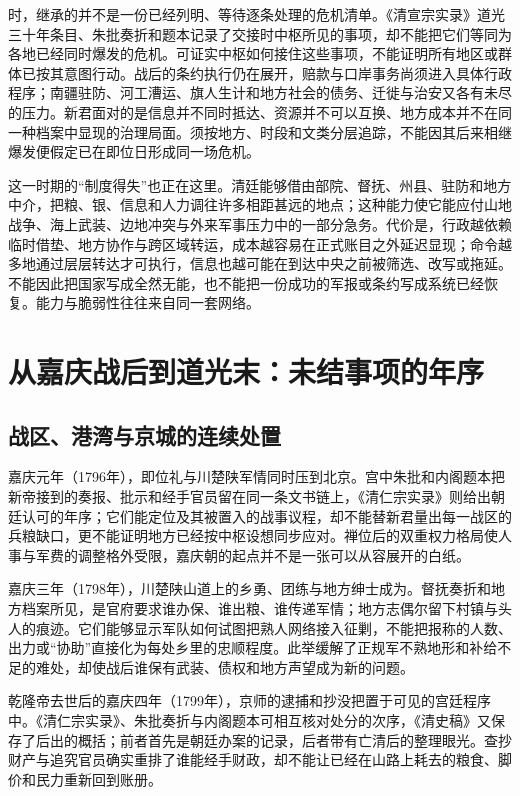 时，继承的并不是一份已经列明、等待逐条处理的危机清单。《清宣宗实录》道光三十年条目、朱批奏折和题本记录了交接时中枢所见的事项，却不能把它们等同为各地已经同时爆发的危机。可证实中枢如何接住这些事项，不能证明所有地区或群体已按其意图行动。战后的条约执行仍在展开，赔款与口岸事务尚须进入具体行政程序；南疆驻防、河工漕运、旗人生计和地方社会的债务、迁徙与治安又各有未尽的压力。新君面对的是信息并不同时抵达、资源并不可以互换、地方成本并不在同一种档案中显现的治理局面。须按地方、时段和文类分层追踪，不能因其后来相继爆发便假定已在即位日形成同一场危机。

这一时期的“制度得失”也正在这里。清廷能够借由部院、督抚、州县、驻防和地方中介，把粮、银、信息和人力调往许多相距甚远的地点；这种能力使它能应付山地战争、海上武装、边地冲突与外来军事压力中的一部分急务。代价是，行政越依赖临时借垫、地方协作与跨区域转运，成本越容易在正式账目之外延迟显现；命令越多地通过层层转达才可执行，信息也越可能在到达中央之前被筛选、改写或拖延。不能因此把国家写成全然无能，也不能把一份成功的军报或条约写成系统已经恢复。能力与脆弱性往往来自同一套网络。


\section{从嘉庆战后到道光末：未结事项的年序}

\subsection{战区、港湾与京城的连续处置}

嘉庆元年（1796年），即位礼与川楚陕军情同时压到北京。宫中朱批和内阁题本把新帝接到的奏报、批示和经手官员留在同一条文书链上，《清仁宗实录》则给出朝廷认可的年序；它们能定位及其被置入的战事议程，却不能替新君量出每一战区的兵粮缺口，更不能证明地方已经按中枢设想同步应对。禅位后的双重权力格局使人事与军费的调整格外受限，嘉庆朝的起点并不是一张可以从容展开的白纸。

嘉庆三年（1798年），川楚陕山道上的乡勇、团练与地方绅士成为。督抚奏折和地方档案所见，是官府要求谁办保、谁出粮、谁传递军情；地方志偶尔留下村镇与头人的痕迹。它们能够显示军队如何试图把熟人网络接入征剿，不能把报称的人数、出力或“协助”直接化为每处乡里的忠顺程度。此举缓解了正规军不熟地形和补给不足的难处，却使战后谁保有武装、债权和地方声望成为新的问题。

乾隆帝去世后的嘉庆四年（1799年），京师的逮捕和抄没把置于可见的宫廷程序中。《清仁宗实录》、朱批奏折与内阁题本可相互核对处分的次序，《清史稿》又保存了后出的概括；前者首先是朝廷办案的记录，后者带有亡清后的整理眼光。查抄财产与追究官员确实重排了谁能经手财政，却不能让已经在山路上耗去的粮食、脚价和民力重新回到账册。

